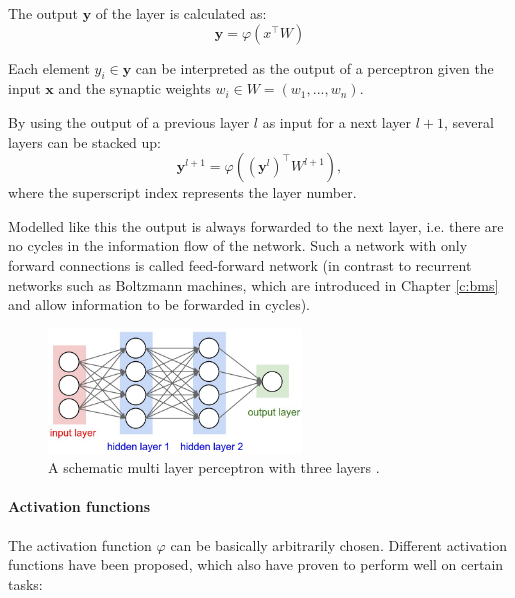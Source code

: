 The output $\textbf{y}$ of the layer is calculated as:
\[
\textbf{y} = \varphi(x^\intercal W)
\]

Each element $y_i \in \textbf{y}$ can be interpreted as the output of a perceptron given the input $\textbf{x}$ and the synaptic weights $w_i \in W = (w_1, ... , w_n)$.

By using the output of a previous layer $l$ as input for a next layer $l+1$, several layers can be stacked up: 
\[
\textbf{y}^{l+1} = \varphi ((\textbf{y}^{l})^\intercal W^{l+1} ) ,
\]
where the superscript index represents the layer number. 

Modelled like this the output is always forwarded to the next layer, i.e. there are no cycles in the information flow of the network.
Such a network with only forward connections is called feed-forward network (in contrast to recurrent networks such as Boltzmann machines, which are introduced in Chapter \ref{c:bms} and allow information to be forwarded in cycles).

\begin{figure}
	\centering
    	\includegraphics[width=0.6\textwidth]{imgs/mlp.jpeg} 
    \caption{A schematic multi layer perceptron with three layers \cite{mlpImg}.}
	\label{fig:mlp}
\end{figure}



\paragraph{Activation functions} \label{c:mlpact}

The activation function $\varphi$ can be basically arbitrarily chosen. 
Different activation functions have been proposed, which also have proven to perform well on certain tasks:

